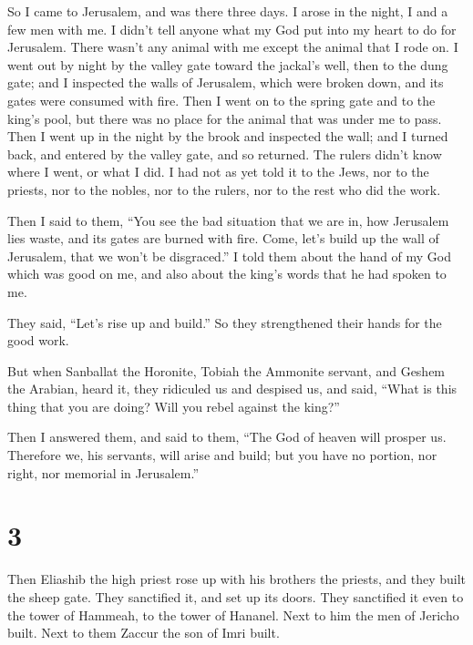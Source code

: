  So I came to Jerusalem, and was there three days.
 I arose in the night, I and a few men with me. I didn't
tell anyone what my God put into my heart to do for Jerusalem. There
wasn't any animal with me except the animal that I rode on.
 I went out by night by the valley gate toward the
jackal's well, then to the dung gate; and I inspected the walls of
Jerusalem, which were broken down, and its gates were consumed with
fire.  Then I went on to the spring gate and to the
king's pool, but there was no place for the animal that was under me to
pass.  Then I went up in the night by the brook and
inspected the wall; and I turned back, and entered by the valley gate,
and so returned.  The rulers didn't know where I went, or
what I did. I had not as yet told it to the Jews, nor to the priests,
nor to the nobles, nor to the rulers, nor to the rest who did the work.

 Then I said to them, ``You see the bad situation that we
are in, how Jerusalem lies waste, and its gates are burned with fire.
Come, let's build up the wall of Jerusalem, that we won't be
disgraced.''  I told them about the hand of my God which
was good on me, and also about the king's words that he had spoken to
me.

They said, ``Let's rise up and build.'' So they strengthened their hands
for the good work.

 But when Sanballat the Horonite, Tobiah the Ammonite
servant, and Geshem the Arabian, heard it, they ridiculed us and
despised us, and said, ``What is this thing that you are doing? Will you
rebel against the king?''

 Then I answered them, and said to them, ``The God of
heaven will prosper us. Therefore we, his servants, will arise and
build; but you have no portion, nor right, nor memorial in Jerusalem.''

\hypertarget{section-2}{%
\section{3}\label{section-2}}

 Then Eliashib the high priest rose up with his brothers
the priests, and they built the sheep gate. They sanctified it, and set
up its doors. They sanctified it even to the tower of Hammeah, to the
tower of Hananel.  Next to him the men of Jericho built.
Next to them Zaccur the son of Imri built.

